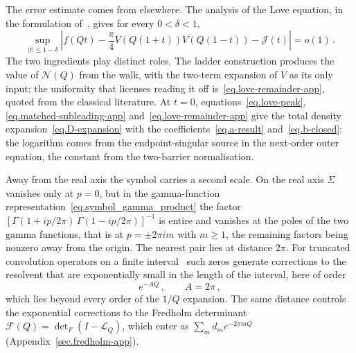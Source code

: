 \documentclass[11pt,a4paper]{article}
\theoremstyle{definition}
\begin{document}
The error estimate comes from elsewhere.  The analysis of the Love
equation, in the formulation of~\cite{Hutson1963,FarinaLangMartin2022}, gives
for every $0<\delta<1$,
\begin{equation}\label{eq.love-remainder-app}
  \sup_{|t|\leq1-\delta}\left|
  f(Qt)-\frac\pi4V(Q(1+t))V(Q(1-t))-\mathcal J(t)
  \right|=o(1)\,.
\end{equation}
The two ingredients play distinct roles.  The ladder construction produces the
value of $\mathcal N(Q)$ from the walk, with the two-term expansion of $V$ as its
only input; the uniformity that licenses reading it off
is~\eqref{eq.love-remainder-app}, quoted from the classical literature.
At $t=0$, equations~\eqref{eq.love-peak}, \eqref{eq.matched-subleading-app}
and~\eqref{eq.love-remainder-app} give the total density
expansion~\eqref{eq.D-expansion} with the coefficients~\eqref{eq.a-result}
and~\eqref{eq.b-closed}: the logarithm comes from the endpoint-singular source
in the next-order outer equation, the constant from the two-barrier
normalisation.

Away from the real axis the symbol carries a second scale.  On the real axis
$\Sigma$ vanishes only at $p = 0$, but in the gamma-function
representation~\eqref{eq.symbol_gamma_product} the factor
$[\Gamma(1 + ip/2\pi)\,\Gamma(1 - ip/2\pi)]^{-1}$ is entire and vanishes at the
poles of the two gamma functions, that is at $p = \pm 2\pi i m$ with
$m \geq 1$, the remaining factors being nonzero away from the origin.  The
nearest pair lies at distance $2\pi$.  For truncated convolution operators on a
finite interval~\cite{Sakhnovich2015} such zeros generate corrections to the
resolvent that are exponentially small in the length of the interval, here of
order
\begin{equation}\label{eq.A-value}
  e^{-AQ}\,,\qquad A = 2\pi\,,
\end{equation}
which lies beyond every order of the $1/Q$ expansion.  The same distance
controls the exponential corrections to the Fredholm determinant
$\mathcal F(Q) = \det_F(I - \mathcal L_Q)$, which enter as
$\sum_m d_m e^{-2\pi m Q}$ (Appendix~\ref{sec.fredholm-app}).
\end{document}
